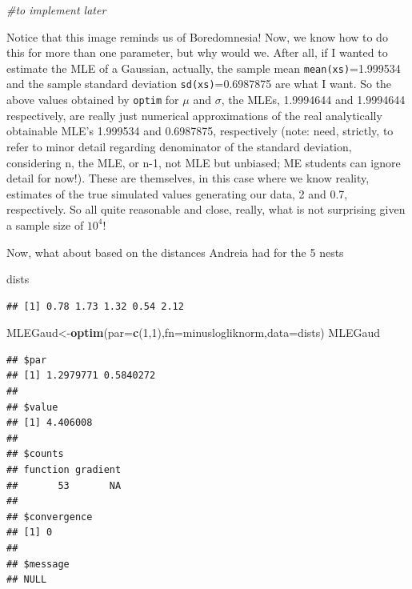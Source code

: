 \documentclass[
]{book}
\newenvironment{Shaded}{\begin{snugshade}}{\end{snugshade}}
\newcommand{\CommentTok}[1]{\textcolor[rgb]{0.56,0.35,0.01}{\textit{#1}}}
\newcommand{\DataTypeTok}[1]{\textcolor[rgb]{0.13,0.29,0.53}{#1}}
\newcommand{\DecValTok}[1]{\textcolor[rgb]{0.00,0.00,0.81}{#1}}
\newcommand{\KeywordTok}[1]{\textcolor[rgb]{0.13,0.29,0.53}{\textbf{#1}}}
\newcommand{\NormalTok}[1]{#1}
\begin{document}
\begin{Shaded}
\begin{Highlighting}[]
\CommentTok{#to implement later}
\end{Highlighting}
\end{Shaded}

Notice that this image reminds us of Boredomnesia! Now, we know how to do this for more than one parameter, but why would we. After all, if I wanted to estimate the MLE of a Gaussian, actually, the sample mean \texttt{mean(xs)}=1.999534 and the sample standard deviation \texttt{sd(xs)}=0.6987875 are what I want. So the above values obtained by \texttt{optim} for \(\mu\) and \(\sigma\), the MLEs, 1.9994644 and 1.9994644 respectively, are really just numerical approximations of the real analytically obtainable MLE's 1.999534 and 0.6987875, respectively (note: need, strictly, to refer to minor detail regarding denominator of the standard deviation, considering n, the MLE, or n-1, not MLE but unbiased; ME students can ignore detail for now!). These are themselves, in this case where we know reality, estimates of the true simulated values generating our data, 2 and 0.7, respectively. So all quite reasonable and close, really, what is not surprising given a sample size of \ensuremath{10^{4}}!

Now, what about based on the distances Andreia had for the 5 nests

\begin{Shaded}
\begin{Highlighting}[]
\NormalTok{dists}
\end{Highlighting}
\end{Shaded}

\begin{verbatim}
## [1] 0.78 1.73 1.32 0.54 2.12
\end{verbatim}

\begin{Shaded}
\begin{Highlighting}[]
\NormalTok{MLEGaud<-}\KeywordTok{optim}\NormalTok{(}\DataTypeTok{par=}\KeywordTok{c}\NormalTok{(}\DecValTok{1}\NormalTok{,}\DecValTok{1}\NormalTok{),}\DataTypeTok{fn=}\NormalTok{minuslogliknorm,}\DataTypeTok{data=}\NormalTok{dists)}
\NormalTok{MLEGaud}
\end{Highlighting}
\end{Shaded}

\begin{verbatim}
## $par
## [1] 1.2979771 0.5840272
## 
## $value
## [1] 4.406008
## 
## $counts
## function gradient 
##       53       NA 
## 
## $convergence
## [1] 0
## 
## $message
## NULL
\end{verbatim}
\end{document}
